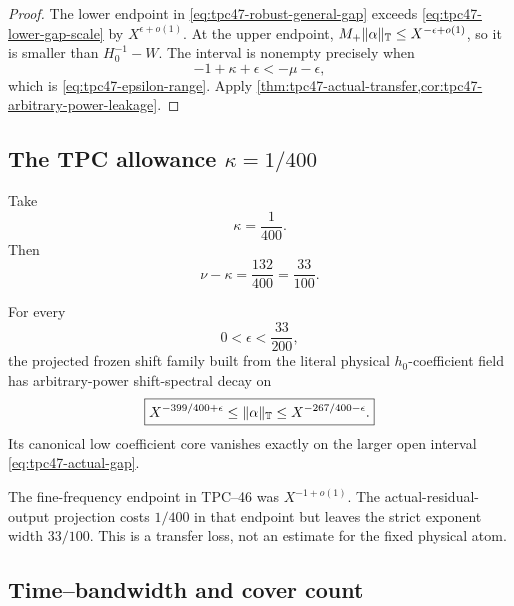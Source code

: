 \begin{proof}
The lower endpoint in \eqref{eq:tpc47-robust-general-gap} exceeds
\eqref{eq:tpc47-lower-gap-scale} by \(X^{\epsilon+o(1)}\).  At the
upper endpoint,
\(M_+\|\alpha\|_{\mathbb T}\le X^{-\epsilon+o(1)}\), so it is smaller than
\(H_0^{-1}-W\).  The interval is nonempty precisely when
\[
 -1+\kappa+\epsilon<-\mu-\epsilon,
\]
which is \eqref{eq:tpc47-epsilon-range}.  Apply
\cref{thm:tpc47-actual-transfer,cor:tpc47-arbitrary-power-leakage}.
\end{proof}

\subsection{The TPC allowance
\texorpdfstring{\(\kappa=1/400\)}{kappa = 1/400}}

Take
\begin{equation}
 \kappa=\frac1{400}.
 \label{eq:tpc47-tpc-kappa}
\end{equation}
Then
\begin{equation}
 \nu-\kappa
 =\frac{132}{400}=\frac{33}{100}.
 \label{eq:tpc47-remaining-width}
\end{equation}

\begin{corollary}
\label{cor:tpc47-tpc-endpoint}
For every
\begin{equation}
 0<\epsilon<\frac{33}{200},
 \label{eq:tpc47-tpc-epsilon}
\end{equation}
 the projected frozen shift family built from the literal physical
 \(h_0\)-coefficient field has
arbitrary-power shift-spectral decay on
\begin{equation}
 \boxed{
 X^{-399/400+\epsilon}
 \le\|\alpha\|_{\mathbb T}\le
 X^{-267/400-\epsilon}.}
 \label{eq:tpc47-final-endpoint-gap}
\end{equation}
Its canonical low coefficient core vanishes exactly on the larger open
interval \eqref{eq:tpc47-actual-gap}.
\end{corollary}

The fine-frequency endpoint in TPC--46 was \(X^{-1+o(1)}\).  The
actual-residual-output projection costs \(1/400\) in that endpoint but
leaves the
strict exponent width \(33/100\).  This is a transfer loss, not an
estimate for the fixed physical atom.

\subsection{Time--bandwidth and cover count}

